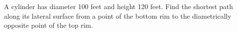 A cylinder has diameter 100 feet and height 120 feet. Find the shortest path along its lateral surface from a point of the bottom rim to the diametrically opposite point of the top rim.
